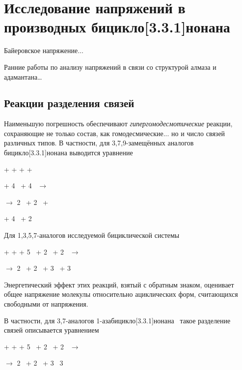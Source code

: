 \chapter{Исследование напряжений в производных бицикло[3.3.1]нонана}\label{ch:Strain:331}

Байеровское напряжение...

Ранние работы по анализу напряжений в связи со структурой алмаза и адамантана\dots~\cite{Mohr:1918}

\section{Реакции разделения связей} 

Наименьшую погрешность обеспечивают \emph{гипергомодесмотические} реакции, сохраняющие не только состав, как гомодесмические... но и число связей различных типов. В частности, для 3,7,9-замещённых аналогов бицикло[3.3.1]нонана выводится уравнение
\begin{center}
 + \DrawMeXMe{} + \DrawMeYMe{} + \DrawMeZMe{} +

+ 4~\DrawPropane{} + 4~\DrawIsoButane{}
  \(\longrightarrow\)
  
\(\longrightarrow\) 2~ + 2~ +

+ 4~\DrawIsoPentane{} + 2~
\end{center}

Для 1,3,5,7-аналогов исследуемой бициклической системы
\begin{center}
   + \DrawMeXMe{} + \DrawMeYMe{} + 5~\DrawPropane{} + 2~ + 2~
  \(\longrightarrow\)
  
  \(\longrightarrow\) 2~ + 2~ + 3~ + 3~
\end{center}

Энергетический эффект этих реакций, взятый с обратным знаком, оценивает общее напряжение молекулы относительно ациклических форм, считающихся свободными от напряжения. 

В частности, для 3,7-аналогов 1-азабицикло[3.3.1]нонана~ такое разделение связей описывается уравнением
\begin{center}
  + \DrawMeXMe{} + \DrawMeYMe{} + 5~\DrawPropane{}
  + 2~\DrawIsoButane{} + 2~\DrawMeNMeMe{}
  \(\longrightarrow\)
  
  \(\longrightarrow\) 
  2~ + 2~ + 3~\DrawIsoPentane{}
  3~\DrawMeNMeEt{}
\end{center}

